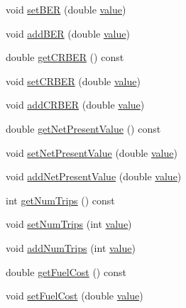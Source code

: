 \begin{DoxyCompactItemize}
void \mbox{\hyperlink{class_vessel_data_a4ed7b67084683a6be22a31a803713ff9}{set\+B\+ER}} (double \mbox{\hyperlink{diffusion_8cpp_a4b41795815d9f3d03abfc739e666d5da}{value}})
\item 
void \mbox{\hyperlink{class_vessel_data_a8f66706854d2da7b0a53e930e3358bf9}{add\+B\+ER}} (double \mbox{\hyperlink{diffusion_8cpp_a4b41795815d9f3d03abfc739e666d5da}{value}})
\item 
double \mbox{\hyperlink{class_vessel_data_a7d9d783f0ce6856464e98c34f9a0cae8}{get\+C\+R\+B\+ER}} () const
\item 
void \mbox{\hyperlink{class_vessel_data_a07ae8da4d91f9839f348bd7996aba7c9}{set\+C\+R\+B\+ER}} (double \mbox{\hyperlink{diffusion_8cpp_a4b41795815d9f3d03abfc739e666d5da}{value}})
\item 
void \mbox{\hyperlink{class_vessel_data_a94c5cda266176c7db7b8e8ba369bcd81}{add\+C\+R\+B\+ER}} (double \mbox{\hyperlink{diffusion_8cpp_a4b41795815d9f3d03abfc739e666d5da}{value}})
\item 
double \mbox{\hyperlink{class_vessel_data_a5cf7d716425daebcb82f4b1d077e4ef7}{get\+Net\+Present\+Value}} () const
\item 
void \mbox{\hyperlink{class_vessel_data_a82a24b800ed3b657ad8f83d5b59b4a83}{set\+Net\+Present\+Value}} (double \mbox{\hyperlink{diffusion_8cpp_a4b41795815d9f3d03abfc739e666d5da}{value}})
\item 
void \mbox{\hyperlink{class_vessel_data_a45ed82071cc2c7e3913d533bf29a77c0}{add\+Net\+Present\+Value}} (double \mbox{\hyperlink{diffusion_8cpp_a4b41795815d9f3d03abfc739e666d5da}{value}})
\item 
int \mbox{\hyperlink{class_vessel_data_a06c8abf592fe0cb371e00b52f2304cb6}{get\+Num\+Trips}} () const
\item 
void \mbox{\hyperlink{class_vessel_data_ade04c205afe59573a3e5be283c121740}{set\+Num\+Trips}} (int \mbox{\hyperlink{diffusion_8cpp_a4b41795815d9f3d03abfc739e666d5da}{value}})
\item 
void \mbox{\hyperlink{class_vessel_data_a4abdf35337d4a7745c795d0f5afcd596}{add\+Num\+Trips}} (int \mbox{\hyperlink{diffusion_8cpp_a4b41795815d9f3d03abfc739e666d5da}{value}})
\item 
double \mbox{\hyperlink{class_vessel_data_a7ea9f153c87d0cda7d6c7b0a8585a765}{get\+Fuel\+Cost}} () const
\item 
void \mbox{\hyperlink{class_vessel_data_a24a615f0950cf5ce9ae4668ff00a0475}{set\+Fuel\+Cost}} (double \mbox{\hyperlink{diffusion_8cpp_a4b41795815d9f3d03abfc739e666d5da}{value}})
\item 

\end{DoxyCompactItemize}
